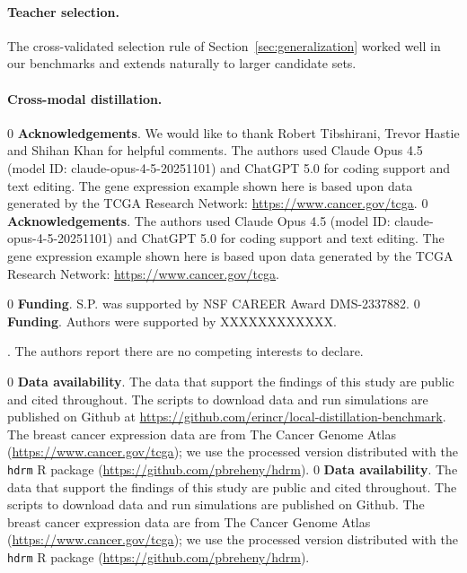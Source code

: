 \documentclass[12pt]{article}
\theoremstyle{definition}
\newcommand{\blind}{0}
\begin{document}
\paragraph{Teacher selection.} The cross-validated selection rule of Section~\ref{sec:generalization} worked well in our benchmarks and extends naturally to larger candidate sets.


\paragraph{Cross-modal distillation.}
\fi

\blind{
{\bf Acknowledgements}. We would like to thank Robert Tibshirani, Trevor Hastie and Shihan Khan for helpful comments. The authors used Claude Opus 4.5 (model ID: claude-opus-4-5-20251101) and ChatGPT 5.0 for coding support and text editing. The gene expression example shown here is based upon data generated by the TCGA Research Network: \url{https://www.cancer.gov/tcga}.
}
\fi
{}\blind{
{\bf Acknowledgements}. The authors used Claude Opus 4.5 (model ID: claude-opus-4-5-20251101) and ChatGPT 5.0 for coding support and text editing. The gene expression example shown here is based upon data generated by the TCGA Research Network: \url{https://www.cancer.gov/tcga}.
}
\fi

\blind{
{\bf Funding}. S.P. was supported by NSF CAREER Award DMS-2337882.}
\fi 
{}\blind{
{\bf Funding}. Authors were supported by XXXXXXXXXXXX.}\fi

. The authors report there are no competing interests to declare.

\blind{
{\bf Data availability}. The data that support the findings of this study are public and cited throughout. The scripts to download data and run simulations are published on Github at \url{https://github.com/erincr/local-distillation-benchmark}. The breast cancer expression data are from
The Cancer Genome Atlas (\url{https://www.cancer.gov/tcga}); we use the processed version distributed with the \texttt{hdrm} R package (\url{https://github.com/pbreheny/hdrm}).
}
\fi
{}\blind{
{\bf Data availability}. The data that support the findings of this study are public and cited throughout. The scripts to download data and run simulations are published on Github. The breast cancer expression data are from The Cancer Genome Atlas (\url{https://www.cancer.gov/tcga}); we use the processed version distributed with the \texttt{hdrm} R package (\url{https://github.com/pbreheny/hdrm}).
}
\fi
\end{document}
